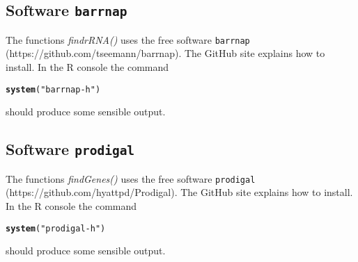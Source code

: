 \documentclass{article}\usepackage[]{graphicx}\usepackage[]{color}
\makeatletter
\newcommand{\hlstr}[1]{\textcolor[rgb]{0.192,0.494,0.8}{#1}}%
\newcommand{\hlstd}[1]{\textcolor[rgb]{0.345,0.345,0.345}{#1}}%
\newcommand{\hlkwd}[1]{\textcolor[rgb]{0.737,0.353,0.396}{\textbf{#1}}}%
\newenvironment{kframe}{%
 \def\at@end@of@kframe{}%
 \ifinner\ifhmode%
  \def\at@end@of@kframe{\end{minipage}}%
  \begin{minipage}{\columnwidth}%
 \fi\fi%
 \def\FrameCommand##1{\hskip\@totalleftmargin \hskip-\fboxsep
 \colorbox{shadecolor}{##1}\hskip-\fboxsep
     \hskip-\linewidth \hskip-\@totalleftmargin \hskip\columnwidth}%
 \MakeFramed {\advance\hsize-\width
   \@totalleftmargin\z@ \linewidth\hsize
   \@setminipage}}%
 {\par\unskip\endMakeFramed%
 \at@end@of@kframe}
\newenvironment{knitrout}{}{} %
\makeatother
\begin{document}
\subsection{Software \texttt{barrnap}}
The functions \emph{findrRNA()} uses the free software \texttt{barrnap} (https://github.com/tseemann/barrnap). The GitHub site explains how to install. In the R console the command
\begin{knitrout}
\color{fgcolor}\begin{kframe}
\begin{alltt}
\hlkwd{system}\hlstd{(}\hlstr{"barrnap -h"}\hlstd{)}
\end{alltt}
\end{kframe}
\end{knitrout}
should produce some sensible output.


\subsection{Software \texttt{prodigal}}
The functions \emph{findGenes()} uses the free software \texttt{prodigal} (https://github.com/hyattpd/Prodigal). The GitHub site explains how to install. In the R console the command
\begin{knitrout}
\color{fgcolor}\begin{kframe}
\begin{alltt}
\hlkwd{system}\hlstd{(}\hlstr{"prodigal -h"}\hlstd{)}
\end{alltt}
\end{kframe}
\end{knitrout}
should produce some sensible output.
\end{document}
